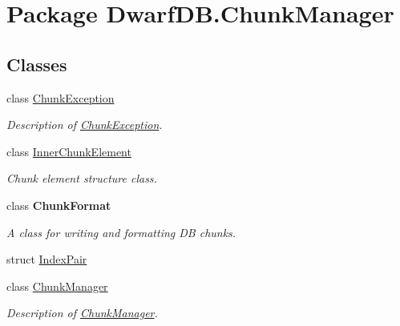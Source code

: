 \hypertarget{namespace_dwarf_d_b_1_1_chunk_manager}{
\section{Package DwarfDB.ChunkManager}
\label{namespace_dwarf_d_b_1_1_chunk_manager}
}
\subsection*{Classes}
\begin{DoxyCompactItemize}
\item 
class \hyperlink{class_dwarf_d_b_1_1_chunk_manager_1_1_chunk_exception}{ChunkException}
\begin{DoxyCompactList}\small\item\em Description of \hyperlink{class_dwarf_d_b_1_1_chunk_manager_1_1_chunk_exception}{ChunkException}. \item\end{DoxyCompactList}\item 
class \hyperlink{class_dwarf_d_b_1_1_chunk_manager_1_1_inner_chunk_element}{InnerChunkElement}
\begin{DoxyCompactList}\small\item\em Chunk element structure class. \item\end{DoxyCompactList}\item 
class {\bfseries ChunkFormat}
\begin{DoxyCompactList}\small\item\em A class for writing and formatting DB chunks. \item\end{DoxyCompactList}\item 
struct \hyperlink{struct_dwarf_d_b_1_1_chunk_manager_1_1_index_pair}{IndexPair}
\item 
class \hyperlink{class_dwarf_d_b_1_1_chunk_manager_1_1_chunk_manager}{ChunkManager}
\begin{DoxyCompactList}\small\item\em Description of \hyperlink{class_dwarf_d_b_1_1_chunk_manager_1_1_chunk_manager}{ChunkManager}. \item\end{DoxyCompactList}\end{DoxyCompactItemize}
